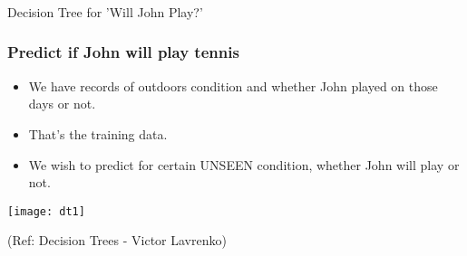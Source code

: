 




\begin{frame}[fragile]\frametitle{}
\begin{center}
{\Large Decision Tree for 'Will John Play?'}
\end{center}
\end{frame}


\begin{frame}[fragile]\frametitle{Predict if John will play tennis}

\begin{itemize}
\item We have records of outdoors condition and whether John played on those days or not. 
\item That's the training data.
\item We wish to predict for certain UNSEEN condition, whether John will play or not.
\end{itemize}
\begin{center}
\texttt{[image: dt1]}
\end{center}
\tiny{(Ref: Decision Trees - Victor Lavrenko)}
\end{frame}

